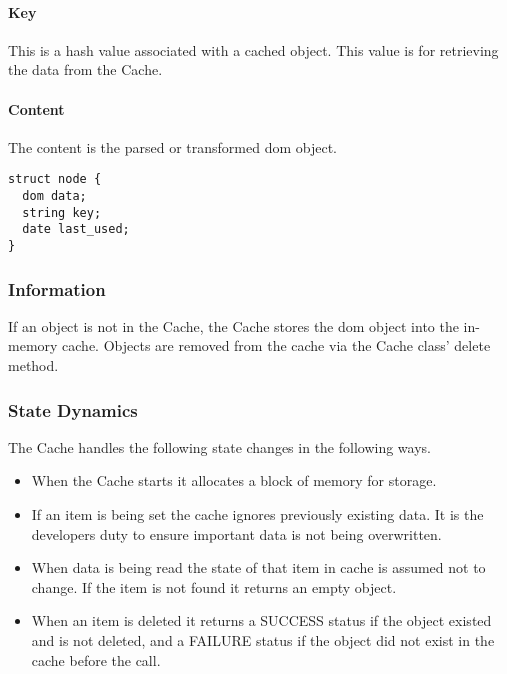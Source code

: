 \begin{enmerate}
\paragraph{Key}
This is a hash value associated with a cached object.
This value is for retrieving the data from the Cache.

\paragraph{Content}
The content is the parsed or transformed \gls{dom} object.

\begin{lstlisting}
struct node {
  dom data;
  string key;
  date last_used;
}
\end{lstlisting}

\subsubsection{Information}

If an object is not in the Cache, the Cache stores the \gls{dom} object into the in-memory cache. 
Objects are removed from the cache via the Cache class' delete method.

\subsubsection{State Dynamics}

The Cache handles the following state changes in the following ways.

\begin{itemize}
    \item {
      When the Cache starts it allocates a block of memory for storage.
     }
    \item {
      If an item is being set the cache ignores previously existing data.
      It is the developers duty to ensure important data is not being overwritten.
    }
    \item {
      When data is being read the state of that item in cache is assumed not to change.
      If the item is not found it returns an empty object.
    }
    \item  When an item is deleted it returns a SUCCESS status if the object existed and is not deleted, and a FAILURE status if the object did not exist in the cache before the call.
\end{itemize}


\end{enmerate}
